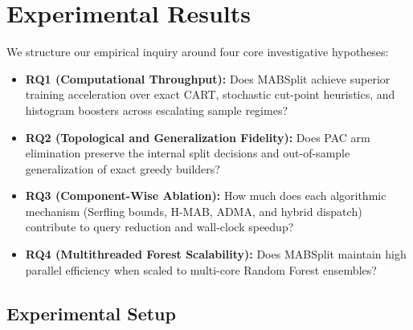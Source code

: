 \section{Experimental Results}
\label{sec:experiments}

We structure our empirical inquiry around four core investigative hypotheses:
\begin{itemize}
    \item \textbf{RQ1 (Computational Throughput):} Does MABSplit achieve superior training acceleration over exact CART, stochastic cut-point heuristics, and histogram boosters across escalating sample regimes?
    \item \textbf{RQ2 (Topological and Generalization Fidelity):} Does PAC arm elimination preserve the internal split decisions and out-of-sample generalization of exact greedy builders?
    \item \textbf{RQ3 (Component-Wise Ablation):} How much does each algorithmic mechanism (Serfling bounds, H-MAB, ADMA, and hybrid dispatch) contribute to query reduction and wall-clock speedup?
    \item \textbf{RQ4 (Multithreaded Forest Scalability):} Does MABSplit maintain high parallel efficiency when scaled to multi-core Random Forest ensembles?
\end{itemize}

\subsection{Experimental Setup}



